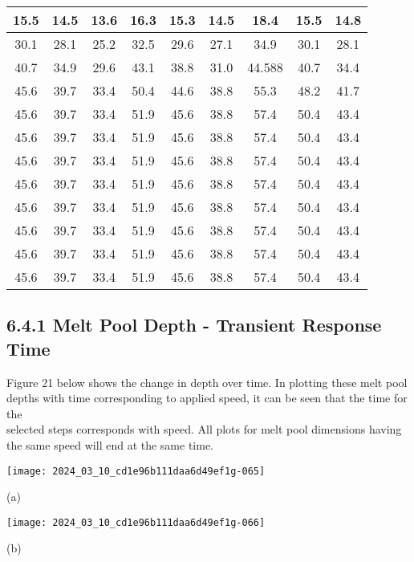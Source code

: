 \documentclass[10pt]{article}
\begin{document}
\begin{center}
\begin{tabular}{|c|c|c|c|c|c|c|c|c|}
\hline
15.5 & 14.5 & 13.6 & 16.3 & 15.3 & 14.5 & 18.4 & 15.5 & 14.8 \\
\hline
30.1 & 28.1 & 25.2 & 32.5 & 29.6 & 27.1 & 34.9 & 30.1 & 28.1 \\
\hline
40.7 & 34.9 & 29.6 & 43.1 & 38.8 & 31.0 & 44.588 & 40.7 & 34.4 \\
\hline
45.6 & 39.7 & 33.4 & 50.4 & 44.6 & 38.8 & 55.3 & 48.2 & 41.7 \\
\hline
45.6 & 39.7 & 33.4 & 51.9 & 45.6 & 38.8 & 57.4 & 50.4 & 43.4 \\
\hline
45.6 & 39.7 & 33.4 & 51.9 & 45.6 & 38.8 & 57.4 & 50.4 & 43.4 \\
\hline
45.6 & 39.7 & 33.4 & 51.9 & 45.6 & 38.8 & 57.4 & 50.4 & 43.4 \\
\hline
45.6 & 39.7 & 33.4 & 51.9 & 45.6 & 38.8 & 57.4 & 50.4 & 43.4 \\
\hline
45.6 & 39.7 & 33.4 & 51.9 & 45.6 & 38.8 & 57.4 & 50.4 & 43.4 \\
\hline
45.6 & 39.7 & 33.4 & 51.9 & 45.6 & 38.8 & 57.4 & 50.4 & 43.4 \\
\hline
45.6 & 39.7 & 33.4 & 51.9 & 45.6 & 38.8 & 57.4 & 50.4 & 43.4 \\
\hline
45.6 & 39.7 & 33.4 & 51.9 & 45.6 & 38.8 & 57.4 & 50.4 & 43.4 \\
\hline
\end{tabular}
\end{center}

\subsection*{6.4.1 Melt Pool Depth - Transient Response Time}
Figure 21 below shows the change in depth over time. In plotting these melt pool depths with time corresponding to applied speed, it can be seen that the time for the\\
selected steps corresponds with speed. All plots for melt pool dimensions having the same speed will end at the same time.

\begin{center}
\texttt{[image: 2024\_03\_10\_cd1e96b111daa6d49ef1g-065]}
\end{center}

(a)

\begin{center}
\texttt{[image: 2024\_03\_10\_cd1e96b111daa6d49ef1g-066]}
\end{center}

(b)
\end{document}
